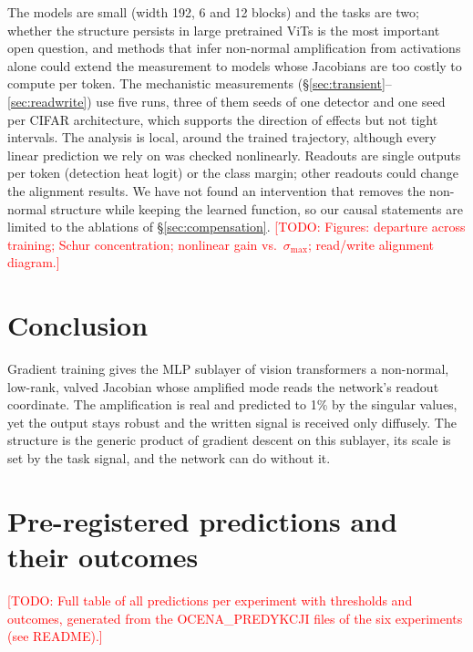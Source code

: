 \documentclass[10pt]{article}
\newcommand{\todo}[1]{\textcolor{red}{[TODO: #1]}}
\begin{document}
The models are small (width 192, 6 and 12 blocks) and the tasks are two; whether the structure persists in large pretrained ViTs is the
most important open question, and methods that infer non-normal amplification from activations alone \citep{saiprasad2026inferring}
could extend the measurement to models whose Jacobians are too costly to compute per token. The mechanistic measurements (\S\ref{sec:transient}--\ref{sec:readwrite}) use five runs, three of them
seeds of one detector and one seed per CIFAR architecture, which supports the direction of effects but not tight intervals. The analysis
is local, around the trained trajectory, although every linear prediction we rely on was checked nonlinearly. Readouts are single outputs
per token (detection heat logit) or the class margin; other readouts could change the alignment results. We have not found an
intervention that removes the non-normal structure while keeping the learned function, so our causal statements are limited to the
ablations of \S\ref{sec:compensation}. \todo{Figures: departure across training; Schur concentration; nonlinear gain vs.\ $\sigma_{\max}$;
read/write alignment diagram.}

\section{Conclusion}

Gradient training gives the MLP sublayer of vision transformers a non-normal, low-rank, valved Jacobian whose amplified mode reads the
network's readout coordinate. The amplification is real and predicted to 1\% by the singular values, yet the output stays robust and the
written signal is received only diffusely. The structure is the generic product of gradient descent on this sublayer, its scale is set by
the task signal, and the network can do without it.



\appendix
\section{Pre-registered predictions and their outcomes}
\label{app:prereg}
\todo{Full table of all predictions per experiment with thresholds and outcomes, generated from the OCENA\_PREDYKCJI files of the six
experiments (see README).}
\end{document}
